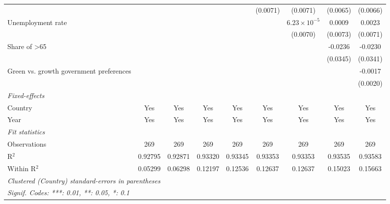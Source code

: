 \begin{table}[htbp]
\begin{tabular}{lcccccccc}
                                               &               &               &               &               & (0.0071)     & (0.0071)              & (0.0065)     & (0.0066)\\   
      Unemployment rate                        &               &               &               &               &              & $6.23\times 10^{-5}$  & 0.0009       & 0.0023\\   
                                               &               &               &               &               &              & (0.0070)              & (0.0073)     & (0.0071)\\   
      Share of >65                             &               &               &               &               &              &                       & -0.0236      & -0.0230\\   
                                               &               &               &               &               &              &                       & (0.0345)     & (0.0341)\\   
      Green vs. growth government preferences  &               &               &               &               &              &                       &              & -0.0017\\   
                                               &               &               &               &               &              &                       &              & (0.0020)\\   
      \midrule
      \emph{Fixed-effects}\\
      Country                                  & Yes           & Yes           & Yes           & Yes           & Yes          & Yes                   & Yes          & Yes\\  
      Year                                     & Yes           & Yes           & Yes           & Yes           & Yes          & Yes                   & Yes          & Yes\\  
      \midrule
      \emph{Fit statistics}\\
      Observations                             & 269           & 269           & 269           & 269           & 269          & 269                   & 269          & 269\\  
      R$^2$                                    & 0.92795       & 0.92871       & 0.93320       & 0.93345       & 0.93353      & 0.93353               & 0.93535      & 0.93583\\  
      Within R$^2$                             & 0.05299       & 0.06298       & 0.12197       & 0.12536       & 0.12637      & 0.12637               & 0.15023      & 0.15663\\  
      \midrule \midrule
      \multicolumn{9}{l}{\emph{Clustered (Country) standard-errors in parentheses}}\\
      \multicolumn{9}{l}{\emph{Signif. Codes: ***: 0.01, **: 0.05, *: 0.1}}\\
   \end{tabular}
\end{table}



